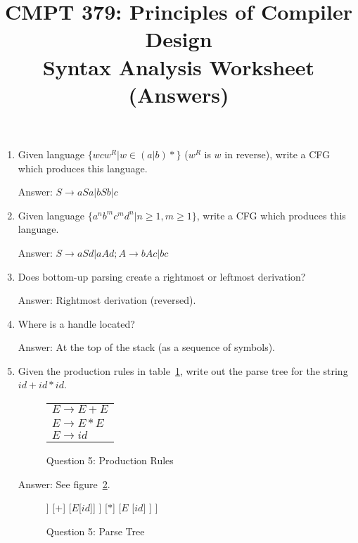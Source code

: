 \documentclass[10pt, oneside, letterpaper]{article}
\title{CMPT 379: Principles of Compiler Design \\\medskip \Large Syntax Analysis Worksheet (Answers)}
\author{}
\date{}
\begin{document}
	\maketitle

	\begin{enumerate}
	
		\item Given language $\bigg\{ wcw^R | w \in (a|b)* \bigg\}$ ($w^R$ is $w$ in reverse), write a CFG which produces this language.
	
		Answer: $S \rightarrow aSa | bSb | c$
		
		\item Given language $\bigg\{ a^n b^m c^m d^n | n \geq 1, m \geq 1 \bigg\}$, write a CFG which produces this language.
		
		Answer: $S \rightarrow aSd | aAd; A \rightarrow bAc | bc$
		
		\item Does bottom-up parsing create a rightmost or leftmost derivation?
		
		Answer: Rightmost derivation (reversed).
		
		\item Where is a handle located?
		
		Answer: At the top of the stack (as a sequence of symbols).
		
		\clearpage
		
		\item Given the production rules in table~\ref{tab:q5-prod-rules}, write out the parse tree for the string $id + id * id$.

\begin{figure}[!htb]
	\caption{Question 5: Production Rules}
	\label{tab:q5-prod-rules}
	\begin{center}
		\begin{tabular}{ l }
			$E \rightarrow E + E$ \\
			$E \rightarrow E * E$ \\
			$E \rightarrow id$
		\end{tabular}
	\end{center}
\end{figure}

		Answer: See figure~\ref{fig:q5-parse-tree}.

\begin{figure}[!htb]
	\caption{Question 5: Parse Tree}
	\label{fig:q5-parse-tree}
	\begin{center}
		\begin{forest}
			[$E$
				[$E$
					[$E$[$id$]]
					[$+$]
					[$E$[$id$]]
				]
				[$*$]
				[$E$
					[$id$]
				]
			]
		\end{forest}
	\end{center}
\end{figure}
		

\end{enumerate}
\end{document}
